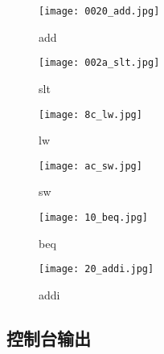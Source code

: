 \begin{figure}[htbp]
    \centering
    \texttt{[image: 0020\_add.jpg]}
    \caption{add}
\end{figure}

\begin{figure}[htbp]
    \centering
    \texttt{[image: 002a\_slt.jpg]}
    \caption{slt}
\end{figure}

\begin{figure}[htbp]
    \centering
    \texttt{[image: 8c\_lw.jpg]}
    \caption{lw}
\end{figure}

\begin{figure}[htbp]
    \centering
    \texttt{[image: ac\_sw.jpg]}
    \caption{sw}
\end{figure}

\begin{figure}[htbp]
    \centering
    \texttt{[image: 10\_beq.jpg]}
    \caption{beq}
\end{figure}

\begin{figure}[htbp]
    \centering
    \texttt{[image: 20\_addi.jpg]}
    \caption{addi}
\end{figure}

\newpage
\subsection{控制台输出}
